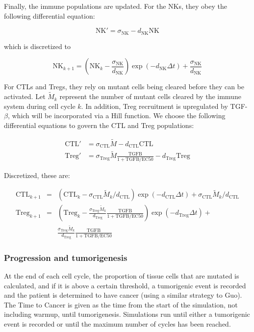 \documentclass[11pt, a4paper, preprint]{article}
\begin{document}
Finally, the immune populations are updated.
For the NKs, they obey the following differential equation:
 
$$ \text{NK}' = \sigma_{\text{NK}} - d_{\text{NK}}\text{NK} $$

which is discretized to
 
$$ \text{NK}_{k+1} = \left (\text{NK}_k-\frac{\sigma_{\text{NK}}}{d_{\text{NK}}} \right )\exp(-d_{\text{NK}}\Delta t)+\frac{\sigma_{\text{NK}}}{d_{\text{NK}}} $$


For CTLs and Tregs, they rely on mutant cells being cleared before they can be activated.
Let $\tilde{M}_k$ represent the number of mutant cells cleared by the immune system during cell cycle $k$.
In addition, Treg recruitment is upregulated by TGF-$\beta$, which will be incorporated via a Hill function.
We choose the following differential equations to govern the CTL and Treg populations:

\begin{align*}
\text{CTL}' & = \sigma_{\text{CTL}}\tilde{M} - d_{\text{CTL}}\text{CTL} \\
\text{Treg}' & = \sigma_{\text{Treg}}\tilde{M} \frac{\text{TGFB}}{1+\text{TGFB}/\text{EC50}}- d_{\text{Treg}}\text{Treg}
\end{align*}

Discretized, these are:

\begin{align*}
\text{CTL}_{k+1} & = & \left (\text{CTL}_k-\sigma_{\text{CTL}}\tilde{M}_k/d_{\text{CTL}}\right )\exp(- d_{\text{CTL}}\Delta t) + \sigma_{\text{CTL}}\tilde{M}_k/d_{\text{CTL}}\\
\text{Treg}_{k+1} & = & \left (\text{Treg}_k-\frac{\sigma_{\text{Treg}}\tilde{M}_k}{d_{\text{Treg}}} \frac{\text{TGFB}}{1+\text{TGFB}/\text{EC50}}\right )\exp(-d_{\text{Treg}}\Delta t)+\\
& & \frac{\sigma_{\text{Treg}}\tilde{M}_k}{d_{\text{Treg}}} \frac{\text{TGFB}}{1+\text{TGFB}/\text{EC50}}
\end{align*}

\subsubsection{Progression and tumorigenesis}
At the end of each cell cycle, the proportion of tissue cells that are mutated is calculated, and if it is above a certain threshold, a tumorigenic event is recorded and the patient is determined to have cancer (using a similar strategy to Guo).
The Time to Cancer is given as the time from the start of the simulation, not including warmup, until tumorigenesis.
Simulations run until either a tumorigenic event is recorded or until the maximum number of cycles has been reached.
\end{document}
